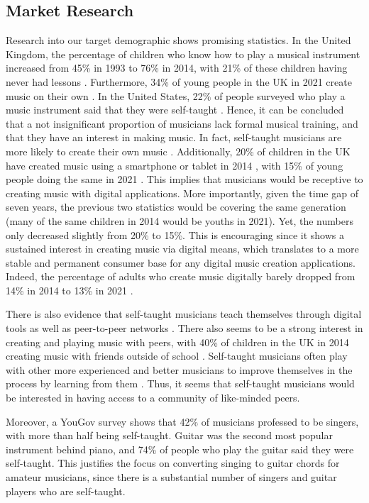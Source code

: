 \subsection{Market Research}
\label{marketresearch}
Research into our target demographic shows promising statistics. In the United Kingdom, the percentage of children who know how to play a musical instrument increased from 45\% in 1993 to 76\% in 2014, with 21\% of these children having never had lessons \cite{abrsm2014}. Furthermore, 34\% of young people in the UK in 2021 create music on their own \cite{abrsm2021}. In the United States, 22\% of people surveyed who play a music instrument said that they were self-taught \cite{gallup2003}. Hence, it can be concluded that a not insignificant proportion of musicians lack formal musical training, and that they have an interest in making music. In fact, self-taught musicians are more likely to create their own music \cite{compareguitarpiano}. Additionally, 20\% of children in the UK have created music using a smartphone or tablet in 2014 \cite{abrsm2014}, with 15\% of young people doing the same in 2021 \cite{abrsm2021}. This implies that musicians would be receptive to creating music with digital applications. More importantly, given the time gap of seven years, the previous two statistics would be covering the same generation (many of the same children in 2014 would be youths in 2021). Yet, the numbers only decreased slightly from 20\% to 15\%. This is encouraging since it shows a sustained interest in creating music via digital means, which translates to a more stable and permanent consumer base for any digital music creation applications. Indeed, the percentage of adults who create music digitally barely dropped from 14\% in 2014 to 13\% in 2021 \cite{abrsm2021}.
 
There is also evidence that self-taught musicians teach themselves through digital tools as well as peer-to-peer networks \cite{abrsm2014} \cite{bookreview}. There also seems to be a strong interest in creating and playing music with peers, with 40\% of children in the UK in 2014 creating music with friends outside of school \cite{abrsm2014}. Self-taught musicians often play with other more experienced and better musicians to improve themselves in the process by learning from them \cite{marketresearch5}. Thus, it seems that self-taught musicians would be interested in having access to a community of like-minded peers. 
 
Moreover, a YouGov survey \cite{YouGovMR} shows that 42\% of musicians professed to be singers, with more than half being self-taught. Guitar was the second most popular instrument behind piano, and 74\% of people who play the guitar said they were self-taught. This justifies the focus on converting singing to guitar chords for amateur musicians, since there is a substantial number of singers and guitar players who are self-taught.  

